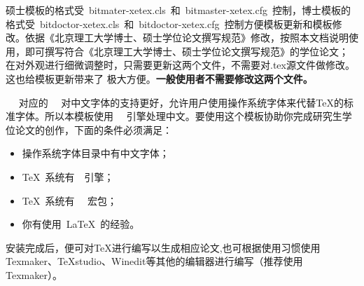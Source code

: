 硕士模板的格式受~bitmater-xetex.cls~和~bitmaster-xetex.cfg~控制，博士模板的格式受~bitdoctor-xetex.cls~和~bitdoctor-xetex.cfg~控制方便模板更新和模板修改。依据《北京理工大学博士、硕士学位论文撰写规范》修改，按照本文档说明使用，即可撰写符合《北京理工大学博士、硕士学位论文撰写规范》的学位论文；
在对外观进行细微调整时，只需要更新这两个文件，不需要对.tex源文件做修改。这也给模板更新带来了
极大方便。\textbf{一般使用者不需要修改这两个文件。}
 
~\XeLaTeX~ 对应的~\XeTeX~ 对中文字体的支持更好，允许用户使用操作系统字体来代替TeX的标准字体。所以本模板使用~\XeLaTeX~ 引擎处理中文。要使用这个模板协助你完成研究生学位论文的创作，下面的条件必须满足：

\begin{itemize}
\item  操作系统字体目录中有中文字体；
\item  \TeX~系统有~\XeTeX~引擎；
\item  \TeX~系统有~ \CTeX~宏包；
\item  你有使用~\LaTeX~的经验。
\end{itemize}

安装完成后，便可对\TeX 进行编写以生成相应论文,也可根据使用习惯使用Texmaker、TeXstudio、Winedit等其他的编辑器进行编写（推荐使用Texmaker）。



